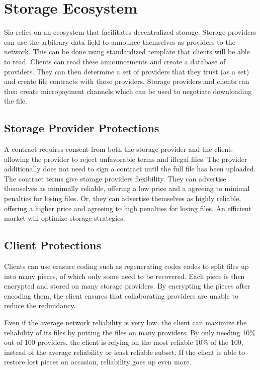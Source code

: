 \documentclass[twocolumn]{article}
\begin{document}
\section{Storage Ecosystem}
Sia relies on an ecosystem that facilitates decentralized storage.
Storage providers can use the arbitrary data field to announce themselves as providers to the network.
This can be done using standardized template that clients will be able to read.
Clients can read these announcements and create a database of providers.
They can then determine a set of providers that they trust (as a set) and create file contracts with those providers.
Storage providers and clients can then create micropayment channels \cite{mpc} which can be used to negotiate downloading the file.

\subsection{Storage Provider Protections}
A contract requires consent from both the storage provider and the client, allowing the provider to reject unfavorable terms and illegal files.
The provider additionally does not need to sign a contract until the full file has been uploaded.
The contract terms give storage providers flexibility.
They can advertise themselves as minimally reliable, offering a low price and a agreeing to minimal penalties for losing files.
Or, they can advertise themselves as highly reliable, offering a higher price and agreeing to high penalties for losing files.
An efficient market will optimize storage strategies.

\subsection{Client Protections}
Clients can use erasure coding such as regenerating codes \cite{reg} codes to split files up into many pieces, of which only some need to be recovered.
Each piece is then encrypted and stored on many storage providers.
By encrypting the pieces after encoding them, the client ensures that collaborating providers are unable to reduce the redundancy.

Even if the average network reliability is very low, the client can maximize the reliability of its files by putting the files on many providers.
By only needing 10\% out of 100 providers, the client is relying on the most reliable 10\% of the 100, instead of the average reliability or least reliable subset.
If the client is able to restore lost pieces on occasion, reliability goes up even more.
\end{document}

